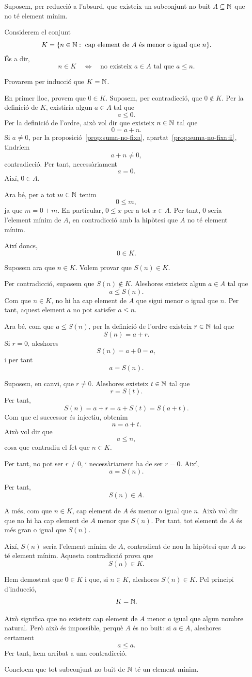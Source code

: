 \begin{prova}
Suposem, per reducció a l'absurd, que existeix un subconjunt no buit $A\subseteq \mathbb{N}$ que no té element mínim.

Considerem el conjunt
\[
K=\{n\in\mathbb{N}:\text{ cap element de }A\text{ és menor o igual que }n\}.
\]
És a dir,
\[
n\in K \quad \Longleftrightarrow \quad \text{no existeix }a\in A\text{ tal que }a\leq n.
\]

Provarem per inducció que $K=\mathbb{N}$.

En primer lloc, provem que $0\in K$. Suposem, per contradicció, que $0\notin K$. Per la definició de $K$, existiria algun $a\in A$ tal que
\[
a\leq 0.
\]
Per la definició de l'ordre, això vol dir que existeix $n\in\mathbb{N}$ tal que
\[
0=a+n.
\]
Si $a\neq 0$, per la proposició~\ref{prop:suma-no-fixa}, apartat~\ref{prop:suma-no-fixa:ii}, tindríem
\[
a+n\neq 0,
\]
contradicció. Per tant, necessàriament
\[
a=0.
\]
Així, $0\in A$.

Ara bé, per a tot $m\in\mathbb{N}$ tenim
\[
0\leq m,
\]
ja que $m=0+m$. En particular, $0\leq x$ per a tot $x\in A$. Per tant, $0$ seria l'element mínim de $A$, en contradicció amb la hipòtesi que $A$ no té element mínim.

Així doncs,
\[
0\in K.
\]

Suposem ara que $n\in K$. Volem provar que $S(n)\in K$.

Per contradicció, suposem que $S(n)\notin K$. Aleshores existeix algun $a\in A$ tal que
\[
a\leq S(n).
\]
Com que $n\in K$, no hi ha cap element de $A$ que sigui menor o igual que $n$. Per tant, aquest element $a$ no pot satisfer $a\leq n$.

Ara bé, com que $a\leq S(n)$, per la definició de l'ordre existeix $r\in\mathbb{N}$ tal que
\[
S(n)=a+r.
\]
Si $r=0$, aleshores
\[
S(n)=a+0=a,
\]
i per tant
\[
a=S(n).
\]

Suposem, en canvi, que $r\neq 0$. Aleshores existeix $t\in\mathbb{N}$ tal que
\[
r=S(t).
\]
Per tant,
\[
S(n)=a+r=a+S(t)=S(a+t).
\]
Com que el successor és injectiu, obtenim
\[
n=a+t.
\]
Això vol dir que
\[
a\leq n,
\]
cosa que contradiu el fet que $n\in K$.

Per tant, no pot ser $r\neq 0$, i necessàriament ha de ser $r=0$. Així,
\[
a=S(n).
\]

Per tant,
\[
S(n)\in A.
\]

A més, com que $n\in K$, cap element de $A$ és menor o igual que $n$. Això vol dir que no hi ha cap element de $A$ menor que $S(n)$. Per tant, tot element de $A$ és més gran o igual que $S(n)$.

Així, $S(n)$ seria l'element mínim de $A$, contradient de nou la hipòtesi que $A$ no té element mínim. Aquesta contradicció prova que
\[
S(n)\in K.
\]

Hem demostrat que $0\in K$ i que, si $n\in K$, aleshores $S(n)\in K$. Pel principi d'inducció,
\[
K=\mathbb{N}.
\]

Això significa que no existeix cap element de $A$ menor o igual que algun nombre natural. Però això és impossible, perquè $A$ és no buit: si $a\in A$, aleshores certament
\[
a\leq a.
\]
Per tant, hem arribat a una contradicció.

Concloem que tot subconjunt no buit de $\mathbb{N}$ té un element mínim.
\end{prova}


